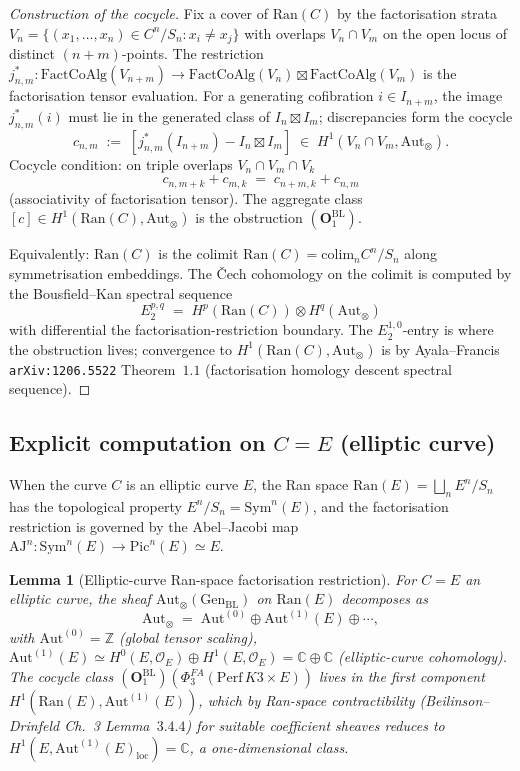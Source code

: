 \documentclass[11pt]{amsart}
\newtheorem{lemma}[theorem]{Lemma}
\newcommand{\cO}{\mathcal{O}}
\newcommand{\Ran}{\mathrm{Ran}}
\newcommand{\FactCoAlg}{\mathrm{FactCoAlg}}
\newcommand{\Perf}{\mathrm{Perf}}
\newcommand{\bC}{\mathbb{C}}
\newcommand{\bZ}{\mathbb{Z}}
\begin{document}
\begin{proof}[Construction of the cocycle]
Fix a cover of $\Ran(C)$ by the factorisation strata
$V_n = \{(x_1,\dots,x_n) \in C^n/S_n : x_i \neq x_j\}$ with
overlaps $V_n \cap V_m$ on the open locus of distinct $(n+m)$-points.
The restriction $j^*_{n,m} : \FactCoAlg(V_{n+m}) \to
\FactCoAlg(V_n) \boxtimes \FactCoAlg(V_m)$ is the factorisation
tensor evaluation. For a generating cofibration $i \in I_{n+m}$, the
image $j^*_{n,m}(i)$ must lie in the generated class of
$I_n \boxtimes I_m$; discrepancies form the cocycle
\[
c_{n,m} \;:=\; [j^*_{n,m}(I_{n+m}) - I_n \boxtimes I_m] \;\in\;
H^1(V_n \cap V_m, \mathrm{Aut}_\otimes).
\]
Cocycle condition: on triple overlaps $V_n \cap V_m \cap V_k$
\[
c_{n,m+k} + c_{m,k} \;=\; c_{n+m,k} + c_{n,m}
\]
(associativity of factorisation tensor). The aggregate class
$[c] \in H^1(\Ran(C), \mathrm{Aut}_\otimes)$ is the obstruction
$(\mathbf{O}_1^{\mathrm{BL}})$.

Equivalently: $\Ran(C)$ is the colimit
$\Ran(C) = \mathrm{colim}_{n} C^n/S_n$ along symmetrisation
embeddings. The \v{C}ech cohomology on the colimit is computed by the
Bousfield--Kan spectral sequence
\[
E_2^{p,q} \;=\; H^p(\Ran(C)) \otimes H^q(\mathrm{Aut}_\otimes)
\]
with differential the factorisation-restriction boundary. The
$E_2^{1,0}$-entry is where the obstruction lives; convergence to
$H^1(\Ran(C), \mathrm{Aut}_\otimes)$ is by Ayala--Francis
\texttt{arXiv:1206.5522} Theorem~$1.1$ (factorisation homology
descent spectral sequence).
\end{proof}

\subsection{Explicit computation on $C = E$ (elliptic curve)}

When the curve $C$ is an elliptic curve $E$, the Ran space
$\Ran(E) = \bigsqcup_n E^n/S_n$ has the topological property
$E^n/S_n = \mathrm{Sym}^n(E)$, and the factorisation restriction is
governed by the Abel--Jacobi map $\mathrm{AJ}^n : \mathrm{Sym}^n(E) \to
\mathrm{Pic}^n(E) \simeq E$.

\begin{lemma}[Elliptic-curve Ran-space factorisation restriction]
\label{lem:ran-E-restriction}
For $C = E$ an elliptic curve, the sheaf
$\mathrm{Aut}_\otimes(\mathrm{Gen}_{\mathrm{BL}})$ on $\Ran(E)$
decomposes as
\[
\mathrm{Aut}_\otimes \;=\;
\mathrm{Aut}^{(0)} \oplus \mathrm{Aut}^{(1)}(E) \oplus \cdots,
\]
with $\mathrm{Aut}^{(0)} = \bZ$ (global tensor scaling),
$\mathrm{Aut}^{(1)}(E) \simeq H^0(E, \cO_E) \oplus H^1(E, \cO_E)
= \bC \oplus \bC$ (elliptic-curve cohomology). The cocycle class
$(\mathbf{O}_1^{\mathrm{BL}})(\Phi^{FA}_3(\Perf\,K3\times E))$ lives
in the first component $H^1(\Ran(E), \mathrm{Aut}^{(1)}(E))$, which
by Ran-space contractibility (Beilinson--Drinfeld Ch.~3 Lemma~$3.4.4$)
for suitable coefficient sheaves reduces to $H^1(E,
\mathrm{Aut}^{(1)}(E)_{\mathrm{loc}}) = \bC$, a one-dimensional
class.
\end{lemma}
\end{document}

